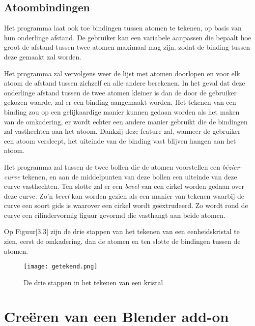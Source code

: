\subsection{Atoombindingen}
Het programma laat ook toe bindingen tussen atomen te tekenen, op basis van hun onderlinge afstand. De gebruiker kan een variabele aanpassen die bepaalt hoe groot de afstand tussen twee atomen maximaal mag zijn, zodat de binding tussen deze gemaakt zal worden.
\par
Het programma zal vervolgens weer de lijst met atomen doorlopen en voor elk atoom de afstand tussen zichzelf en alle andere berekenen. In het geval dat deze onderlinge afstand tussen de twee atomen kleiner is dan de door de gebruiker gekozen waarde, zal er een binding aangemaakt worden. Het tekenen van een binding zou op een gelijkaardige manier kunnen gedaan worden als het maken van de omkadering, er wordt echter een andere manier gebruikt die de bindingen zal vasthechten aan het atoom. Dankzij deze feature zal, wanneer de gebruiker een atoom versleept, het uiteinde van de binding vast blijven hangen aan het atoom.
\par
Het programma zal tussen de twee bollen die de atomen voorstellen een \textit{bézier-curve} tekenen, en aan de middelpunten van deze bollen een uiteinde van deze curve vasthechten. Ten slotte zal er een \textit{bevel} van een cirkel worden gedaan over deze curve. Zo'n \textit{bevel} kan worden gezien als een manier van tekenen waarbij de curve een soort gids is waarover een cirkel wordt geëxtrudeerd. Zo wordt  rond de curve een cilindervormig figuur gevormd die vasthangt aan beide atomen. 
\par
Op Figuur[3.3] zijn de drie stappen van het tekenen van een eenheidskristal te zien, eerst de omkadering, dan de atomen en ten slotte de bindingen tussen de atomen.
\begin{figure}[h]
\texttt{[image: getekend.png]}
\caption{De drie stappen in het tekenen van een kristal}
\end{figure}

\section{Creëren van een Blender add-on}

